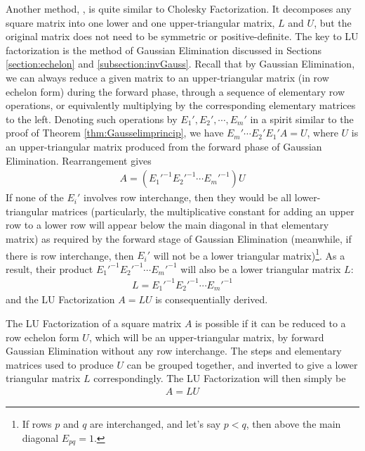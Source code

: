 Another method, , is quite similar to Cholesky Factorization. It decomposes any square matrix into one lower and one upper-triangular matrix, $L$ and $U$, but the original matrix does not need to be symmetric or positive-definite. The key to LU factorization is the method of Gaussian Elimination discussed in Sections \ref{section:echelon} and \ref{subsection:invGauss}. Recall that by Gaussian Elimination, we can always reduce a given matrix to an upper-triangular matrix (in row echelon form) during the forward phase, through a sequence of elementary row operations, or equivalently multiplying by the corresponding elementary matrices to the left. Denoting such operations by $E_1', E_2', \cdots, E_m'$ in a spirit similar to the proof of Theorem \ref{thm:Gausselimprincip}, we have $E_m'\cdots E_2'E_1'A = U$, where $U$ is an upper-triangular matrix produced from the forward phase of Gaussian Elimination. Rearrangement gives
\begin{align}
A = (E_1'^{-1}E_2'^{-1}\cdots E_m'^{-1})U    
\end{align}
If none of the $E_i'$ involves row interchange, then they would be all lower-triangular matrices (particularly, the multiplicative constant for adding an upper row to a lower row will appear below the main diagonal in that elementary matrix) as required by the forward stage of Gaussian Elimination (meanwhile, if there is row interchange, then $E_i'$ will not be a lower triangular matrix)\footnote{If rows $p$ and $q$ are interchanged, and let's say $p < q$, then above the main diagonal $E_{pq} = 1$.}. As a result, their product $E_1'^{-1}E_2'^{-1}\cdots E_m'^{-1}$ will also be a lower triangular matrix $L$:
\begin{align}
L = E_1'^{-1}E_2'^{-1}\cdots E_m'^{-1}    
\end{align}
and the LU Factorization $A = LU$ is consequentially derived.
\begin{thm}[LU Factorization]
The LU Factorization of a square matrix $A$ is possible if it can be reduced to a row echelon form $U$, which will be an upper-triangular matrix, by forward Gaussian Elimination without any row interchange. The steps and elementary matrices used to produce $U$ can be grouped together, and inverted to give a lower triangular matrix $L$ correspondingly. The LU Factorization will then simply be
\begin{align}
A = LU   
\end{align}
\end{thm}

